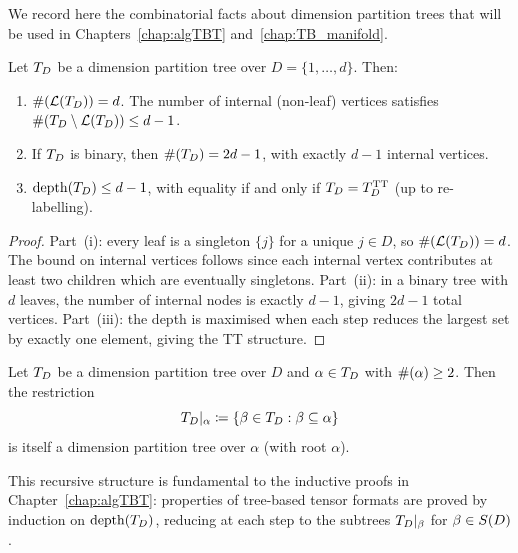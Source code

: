 We record here the combinatorial facts about dimension partition trees
that will be used in Chapters~\ref{chap:algTBT} and~\ref{chap:TB_manifold}.

\begin{proposition}
\label{prop:tree_cardinality}
Let $T_D$ be a dimension partition tree over $D = \{1,\ldots,d\}$.
Then:
\begin{enumerate}
\item[\textup{(i)}] $\#(\mathcal{L}(T_D)) = d$. The number of internal
    \textup{(}non-leaf\textup{)} vertices satisfies
    $\#(T_D \setminus \mathcal{L}(T_D)) \leq d - 1$.
\item[\textup{(ii)}] If $T_D$ is binary, then
    $\#(T_D) = 2d - 1$, with exactly $d - 1$ internal vertices.
\item[\textup{(iii)}] $\mathrm{depth}(T_D) \leq d - 1$, with equality if and
    only if $T_D = T_D^{\mathrm{TT}}$ (up to re-labelling).
\end{enumerate}
\end{proposition}

\begin{proof}
Part~(i): every leaf is a singleton $\{j\}$ for a unique $j \in D$,
so $\#(\mathcal{L}(T_D)) = d$. The bound on internal vertices follows since
each internal vertex contributes at least two children which are
eventually singletons. Part~(ii): in a binary tree with $d$ leaves,
the number of internal nodes is exactly $d - 1$, giving $2d-1$ total
vertices. Part~(iii): the depth is maximised when each step reduces
the largest set by exactly one element, giving the TT structure.
\end{proof}

\begin{proposition}
\label{prop:subtree}
Let $T_D$ be a dimension partition tree over $D$ and
$\alpha \in T_D$ with $\#(\alpha) \geq 2$. Then the restriction
\begin{equation*}
    T_D|_\alpha \coloneqq \{\beta \in T_D : \beta \subseteq \alpha\}
\end{equation*}
is itself a dimension partition tree over $\alpha$ (with root $\alpha$).
\end{proposition}

This recursive structure is fundamental to the inductive proofs
in Chapter~\ref{chap:algTBT}: properties of tree-based tensor formats
are proved by induction on $\mathrm{depth}(T_D)$, reducing at each step to the
subtrees $T_D|_\beta$ for $\beta \in S(D)$.

